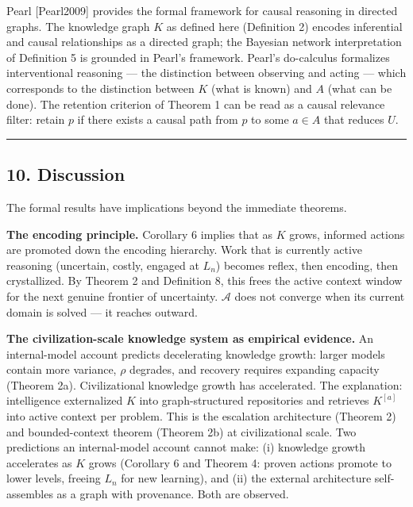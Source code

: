 \documentclass[
]{article}
\begin{document}
Pearl {[}Pearl2009{]} provides the formal framework for causal reasoning
in directed graphs. The knowledge graph \(K\) as defined here (Definition
2) encodes inferential and causal relationships as a directed graph; the
Bayesian network interpretation of Definition 5 is grounded in Pearl's
framework. Pearl's do-calculus formalizes interventional reasoning ---
the distinction between observing and acting --- which corresponds to
the distinction between \(K\) (what is known) and \(A\) (what can be
done). The retention criterion of Theorem 1 can be read as a
causal relevance filter: retain \(p\) if there exists a causal path
from \(p\) to some \(a \in A\) that reduces \(U\).

\begin{center}\rule{0.5\linewidth}{0.5pt}\end{center}

\subsection{10. Discussion}\label{discussion}

The formal results have implications beyond the immediate theorems.

\textbf{The encoding principle.} Corollary 6
implies that as \(K\) grows, informed actions are promoted
down the encoding hierarchy. Work that is currently active reasoning
(uncertain, costly, engaged at \(L_n\)) becomes reflex, then encoding,
then crystallized. By Theorem 2 and
Definition 8, this frees the active context window for the next genuine
frontier of uncertainty. \(\mathcal{A}\) does not converge when its
current domain is solved --- it reaches outward.

\textbf{The civilization-scale knowledge system as empirical evidence.}
An internal-model account predicts decelerating knowledge growth: larger
models contain more variance, \(\rho\) degrades, and recovery requires
expanding capacity (Theorem 2a). Civilizational knowledge growth has
accelerated. The explanation: intelligence externalized \(K\) into
graph-structured repositories and retrieves \(K^{[a]}\) into active
context per problem. This is the escalation architecture (Theorem 2) and
bounded-context theorem (Theorem 2b) at civilizational scale. Two
predictions an internal-model account cannot make: (i) knowledge growth
accelerates as \(K\) grows (Corollary 6 and Theorem 4: proven actions
promote to lower levels, freeing \(L_n\) for new learning), and (ii) the
external
architecture self-assembles as a graph with provenance. Both are
observed.
\end{document}
